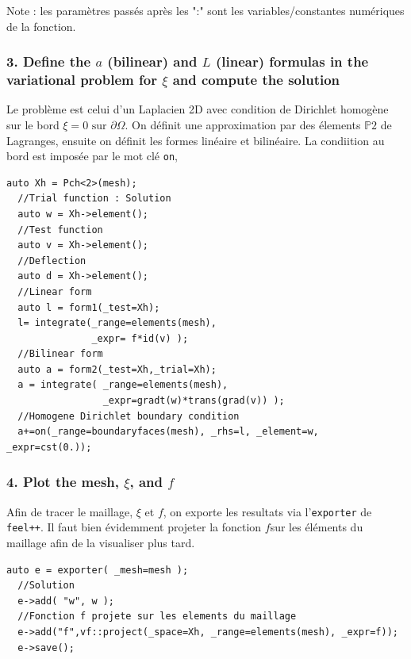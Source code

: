 \documentclass[a4paper,oneside,10pt]{report}
\begin{document}
Note : les paramètres passés après les ":" sont les variables/constantes numériques de la fonction.


\subsubsection{3. Define the $a$ (bilinear) and $L$ (linear) formulas in the variational problem for $\xi$ and compute the solution}

Le problème est celui d'un Laplacien 2D avec condition de Dirichlet homogène sur le bord $\xi = 0 \mbox{ sur } \partial \Omega$. On définit une approximation par des élements $\mathbb{P}2$ de Lagranges, ensuite on définit les formes linéaire et bilinéaire. La condiition au bord est imposée par le mot clé \texttt{on},

\begin{center}
\begin{minipage}{\textwidth}
\begin{lstlisting}[label=code2,caption=membrane.cpp - Espace et forme linéaire/bilinéaire]
  auto Xh = Pch<2>(mesh);
  //Trial function : Solution
  auto w = Xh->element();
  //Test function
  auto v = Xh->element();
  //Deflection
  auto d = Xh->element();
  //Linear form
  auto l = form1(_test=Xh);
  l= integrate(_range=elements(mesh),
               _expr= f*id(v) );
  //Bilinear form
  auto a = form2(_test=Xh,_trial=Xh);
  a = integrate( _range=elements(mesh),
                 _expr=gradt(w)*trans(grad(v)) );
  //Homogene Dirichlet boundary condition
  a+=on(_range=boundaryfaces(mesh), _rhs=l, _element=w, _expr=cst(0.));
\end{lstlisting}
\end{minipage}
\end{center}



\subsubsection{4. Plot the mesh, $\xi$, and $f$}
Afin de tracer le maillage, $\xi$ et $f$, on exporte les resultats via l'\texttt{exporter} de \texttt{feel++}. Il faut bien évidemment projeter la fonction $f$sur les éléments du maillage afin de la visualiser plus tard.

\begin{center}
\begin{minipage}{\textwidth}
\begin{lstlisting}[label=code2,caption=membrane.cpp - export des résultats]
auto e = exporter( _mesh=mesh ); 
  //Solution
  e->add( "w", w );
  //Fonction f projete sur les elements du maillage
  e->add("f",vf::project(_space=Xh, _range=elements(mesh), _expr=f));
  e->save();
\end{lstlisting}
\end{minipage}
\end{center}
\end{document}

